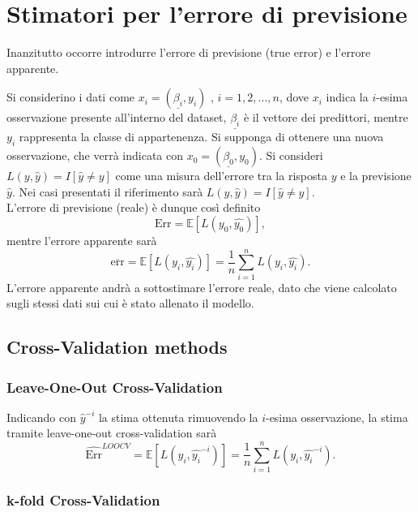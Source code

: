 \chapter{Stimatori per l'errore di previsione}
\label{ch:capitolo5}

Inanzitutto occorre introdurre l'errore di previsione (true error) e l'errore apparente.

Si considerino i dati come $x_i =  (\underline{\beta_i},y_i)$ , $i = 1,2,...,n$, dove $x_i$ indica la $i$-esima osservazione presente all'interno del dataset, $\underline{\beta_i}$ è il vettore dei predittori, mentre $y_i$ rappresenta la classe di appartenenza.
Si supponga di ottenere una nuova osservazione, che verrà indicata con $x_0 =  (\underline{\beta_0},y_0)$.
Si consideri ${L(y,\hat{y})}=I[\hat{y} \neq y]$ come una misura dell'errore tra la risposta $y$ e la previsione $\hat{y}$. Nei casi presentati il riferimento sarà ${L(y,\hat{y})}=I[\hat{y} \neq y]$. \\
L'errore di previsione (reale) è dunque così definito
\begin{equation}
\text{Err} = \mathbb{E}[L(y_0, \hat{y_0})],
\end{equation}
mentre l'errore apparente sarà
\begin{equation}
\overline{\text{err}} = \mathbb{E}[L(y_i, \hat{y_i})] = \frac{1}{n} \sum_{i=1}^{n} L(y_i, \hat{y_i}).
\end{equation}
L'errore apparente andrà a sottostimare l'errore reale, dato che viene calcolato sugli stessi dati sui cui è stato allenato il modello.

\section{Cross-Validation methods}
\label{sec:sezione5.1}

\subsection{Leave-One-Out Cross-Validation}
\label{sec:sezione5.1.1}

Indicando con $\hat{y}^{-i}$ la stima ottenuta rimuovendo la $i$-esima osservazione, la stima tramite leave-one-out cross-validation sarà
\begin{equation}
\widehat{\text{Err}}^{LOOCV} = \mathbb{E}[L(y_i, \hat{y_i}^{-i})] = \frac{1}{n} \sum_{i=1}^{n} L(y_i, \hat{y_i}^{-i}).
\end{equation}

\subsection{k-fold Cross-Validation}
\label{sec:sezione5.1.2}

